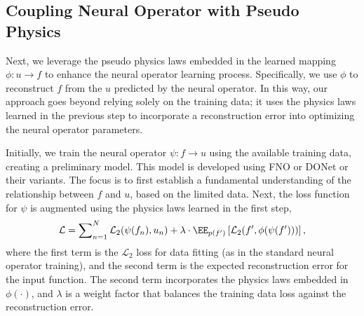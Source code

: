 

\subsection{Coupling Neural Operator with Pseudo Physics}
Next, we leverage the pseudo physics laws embedded in the learned mapping \(\phi: u \rightarrow f\) to enhance the neural operator learning process. Specifically, we use \(\phi\) to reconstruct \(f\) from the \(u\) predicted by the neural operator. %
In this way, our approach goes beyond relying solely on the training data; it uses the physics laws learned in the previous step to incorporate a reconstruction error into optimizing the neural operator parameters. %


Initially, we train the neural operator \(\psi: f \rightarrow u\) using the available training data, creating a preliminary model. This model is developed using FNO or DONet or their variants. The focus is to first establish a fundamental understanding of the relationship between \(f\) and \(u\), based on the limited data. Next, the loss function for \(\psi\) is augmented using the physics laws learned in the first step, %
\begin{align}
 	\mathcal{L}=  \sum\nolimits_{n=1}^{N} \mathcal{L}_2(\psi(f_n),u_n) + \lambda \cdot  \EE_{p(f')} \left[\mathcal{L}_2(f', \phi(\psi(f')))\right], \label{eq:ppi-loss}
 \end{align}
where the first term is the \(\mathcal{L}_2\) loss for data fitting (as in the standard neural operator training), and the second term is the expected reconstruction error for the input function.  %
The second term incorporates the physics laws embedded in $\phi(\cdot)$, and \(\lambda\) is a weight factor that balances the training data loss against the reconstruction error.

